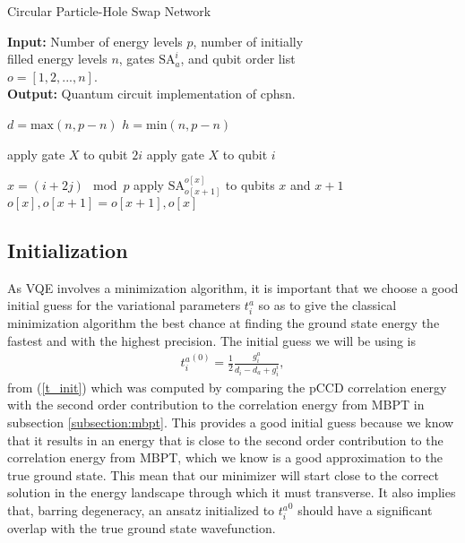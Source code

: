 \documentclass[10pt]{article}
\begin{document}
\begin{algorithm}[H]

\caption{Circular Particle-Hole Swap Network}\label{lphsn}

\hspace*{\algorithmicindent} \textbf{Input:} Number of energy levels $p$, number of initially 
\\
\hspace*{\algorithmicindent} filled energy levels $n$, gates $\text{SA}^i_a$, and qubit order list 
\\
\hspace*{\algorithmicindent} $o=[1,2,...,n]$.
\\
\hspace*{\algorithmicindent} \textbf{Output:} Quantum circuit implementation of cphsn.

\begin{algorithmic}[H]

\State $d = \text{max}(n,p-n)$ 
\State $h = \text{min}(n,p-n)$ 

    \State apply gate $X$ to qubit $2i$
\EndFor
{}
    \State apply gate $X$ to qubit $i$
    \EndFor
\EndIf

        \State $x=(i+2j) \mod{p}$
        \State apply $\text{SA}^{o[x]}_{o[x+1]}$ to qubits $x$ and $x+1$
        \State $o[x], o[x+1] = o[x+1], o[x]$
    \EndFor
\EndFor

\end{algorithmic}

\end{algorithm}

\subsection{Initialization}

As VQE involves a minimization algorithm, it is important that we choose a good initial guess for the variational parameters $t^a_i$ so as to give the classical minimization algorithm the best chance at finding the ground state energy the fastest and with the highest precision. The initial guess we will be using is 
\begin{align}
\label{t_init_copy}
{t^a_i}^{(0)}
=
\frac{1}{2}\frac{g^a_i}{d_i-d_a+g^i_i},
\end{align}
from (\ref{t_init}) which was computed by comparing the pCCD correlation energy with the second order contribution to the correlation energy from MBPT in subsection \ref{subsection:mbpt}. This provides a good initial guess because we know that it results in an energy that is close to the second order contribution to the correlation energy from MBPT, which we know is a good approximation to the true ground state. This mean that our minimizer will start close to the correct solution in the energy landscape through which it must transverse. It also implies that, barring degeneracy, an ansatz initialized to ${t^a_i}^{0}$ should have a significant overlap with the true ground state wavefunction.
\end{document}
